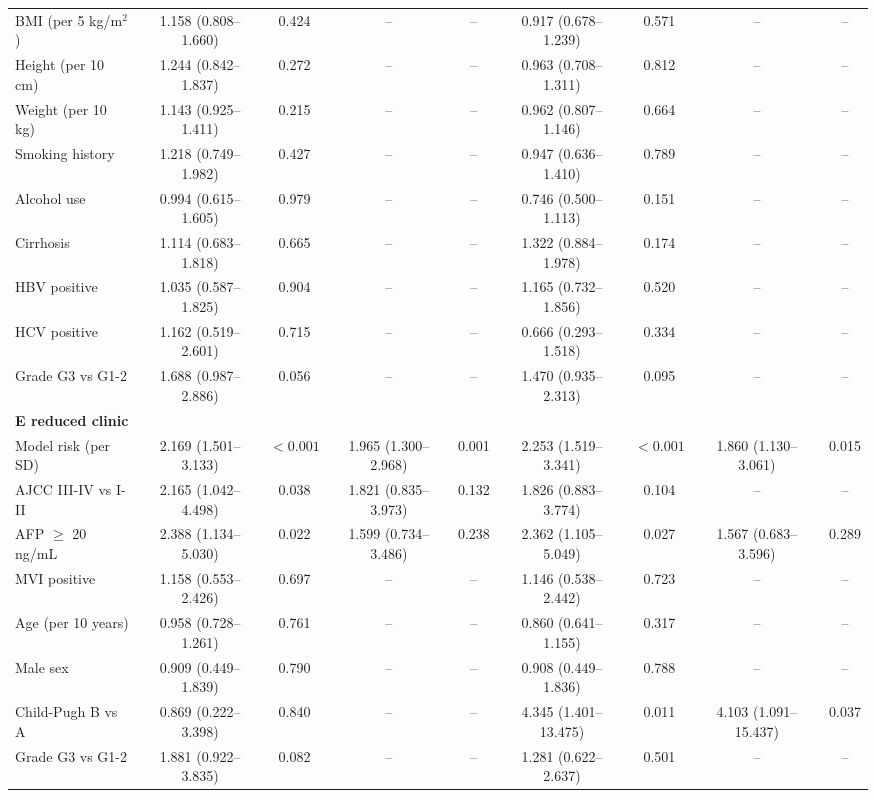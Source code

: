 \begin{table}[!htbp]
{\begin{tabular}{lcccccccc}
BMI (per 5 kg/m$^2$) & 1.158 (0.808--1.660) & 0.424 & -- & -- & 0.917 (0.678--1.239) & 0.571 & -- & -- \\
Height (per 10 cm) & 1.244 (0.842--1.837) & 0.272 & -- & -- & 0.963 (0.708--1.311) & 0.812 & -- & -- \\
Weight (per 10 kg) & 1.143 (0.925--1.411) & 0.215 & -- & -- & 0.962 (0.807--1.146) & 0.664 & -- & -- \\
Smoking history & 1.218 (0.749--1.982) & 0.427 & -- & -- & 0.947 (0.636--1.410) & 0.789 & -- & -- \\
Alcohol use & 0.994 (0.615--1.605) & 0.979 & -- & -- & 0.746 (0.500--1.113) & 0.151 & -- & -- \\
Cirrhosis & 1.114 (0.683--1.818) & 0.665 & -- & -- & 1.322 (0.884--1.978) & 0.174 & -- & -- \\
HBV positive & 1.035 (0.587--1.825) & 0.904 & -- & -- & 1.165 (0.732--1.856) & 0.520 & -- & -- \\
HCV positive & 1.162 (0.519--2.601) & 0.715 & -- & -- & 0.666 (0.293--1.518) & 0.334 & -- & -- \\
Grade G3 vs G1-2 & 1.688 (0.987--2.886) & 0.056 & -- & -- & 1.470 (0.935--2.313) & 0.095 & -- & -- \\
\midrule
\multicolumn{9}{l}{\textbf{E reduced clinic}} \\
Model risk (per SD) & 2.169 (1.501--3.133) & $<0.001$ & 1.965 (1.300--2.968) & 0.001 & 2.253 (1.519--3.341) & $<0.001$ & 1.860 (1.130--3.061) & 0.015 \\
AJCC III-IV vs I-II & 2.165 (1.042--4.498) & 0.038 & 1.821 (0.835--3.973) & 0.132 & 1.826 (0.883--3.774) & 0.104 & -- & -- \\
AFP $\geq$ 20 ng/mL & 2.388 (1.134--5.030) & 0.022 & 1.599 (0.734--3.486) & 0.238 & 2.362 (1.105--5.049) & 0.027 & 1.567 (0.683--3.596) & 0.289 \\
MVI positive & 1.158 (0.553--2.426) & 0.697 & -- & -- & 1.146 (0.538--2.442) & 0.723 & -- & -- \\
Age (per 10 years) & 0.958 (0.728--1.261) & 0.761 & -- & -- & 0.860 (0.641--1.155) & 0.317 & -- & -- \\
Male sex & 0.909 (0.449--1.839) & 0.790 & -- & -- & 0.908 (0.449--1.836) & 0.788 & -- & -- \\
Child-Pugh B vs A & 0.869 (0.222--3.398) & 0.840 & -- & -- & 4.345 (1.401--13.475) & 0.011 & 4.103 (1.091--15.437) & 0.037 \\
Grade G3 vs G1-2 & 1.881 (0.922--3.835) & 0.082 & -- & -- & 1.281 (0.622--2.637) & 0.501 & -- & -- \\

\end{tabular}}
\end{table}
